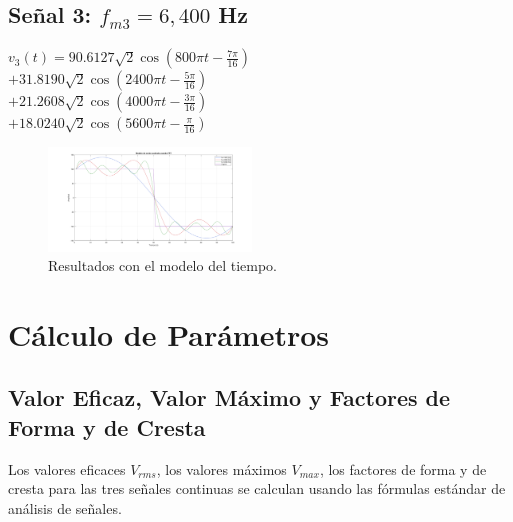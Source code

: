 \documentclass[conference]{IEEEtran}
\theoremstyle{mytheoremstyle}
\theoremstyle{mytheoremstyle}
\theoremstyle{myproblemstyle}
\begin{document}
        \subsection{Señal 3: $f_{m3} = 6,400$ Hz}
        \begin{center}
            $v_3(t)=\displaystyle 90.6127\sqrt{2}\cos\left(800\pi t-\frac{7\pi}{16}\right)$ \\ 
            \vspace{0.2cm}
            $+31.8190\sqrt{2}\cos\left(2400\pi t-\frac{5\pi}{16}\right)$ \\ 
            \vspace{0.2cm}
            $+21.2608\sqrt{2}\cos\left(4000\pi t-\frac{3\pi}{16}\right)$ \\ 
            \vspace{0.2cm}
            $+18.0240\sqrt{2}\cos\left(5600\pi t-\frac{\pi}{16}\right)$
        \end{center}

        \begin{figure}[ht!] %
            \centering
            \includegraphics[width=0.48\textwidth]{img/prac8.png} %
            \caption{Resultados con el modelo del tiempo.}
            \label{fig:hoja}
        \end{figure}

        \section{Cálculo de Parámetros}
        \subsection{Valor Eficaz, Valor Máximo y Factores de Forma y de Cresta}
        Los valores eficaces \( V_{rms} \), los valores máximos \( V_{max} \), los factores de forma y de cresta para las tres señales continuas se calculan usando las fórmulas estándar de análisis de señales.
        
\end{document}
